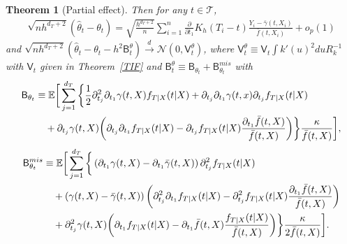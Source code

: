 \documentclass[lettersize, 12pt]{article}
\newtheorem{theorem}{Theorem}
\begin{document}
\begin{theorem}[Partial effect]
Then for any $t \in \mathcal{T}$, 
\begin{align}
\sqrt{nh^{d_T + 2}}( \hat \theta_t - \theta_{t} ) = \sqrt{\frac{h^{d_T+2}}{n}}  \sum_{i=1}^n \frac{\partial}{\partial t_1} K_h(T_i - t) \frac{Y_i - \bar\gamma(t, X_i)}{\bar f(t,X_i)}
 + o_p(1)
 \label{EIFME}
 \end{align}
and 
$\sqrt{nh^{d_T + 2}}( \hat \theta_t - \theta_{t} - h^2 \mathsf{B}_t^\theta)   \stackrel{d}{\longrightarrow}  \mathcal{N}(0, \mathsf{V}_t^\theta)$,
where 
$\mathsf{V}_t^\theta \equiv \mathsf{V}_t \int k'(u)^2du R_k^{-1}$ with $\mathsf{V}_t$ given in Theorem~\ref{TIF}
and 
$\mathsf{B}^{\theta}_t \equiv\mathsf{B}_{\theta_t}  + \mathsf{B}_{\theta_t}^{mis}$ with
\begin{align*}
\mathsf{B}_{\theta_t} &\equiv \mathbb{E}\bigg[
\sum_{j=1}^{d_T}   
 \bigg\{
 \frac{1}{2}\partial_{t_j}^2 \partial_{t_1} \gamma(t, X) f_{T|X}(t|X)+ \partial_{t_j} \partial_{t_1} \gamma(t, x) \partial_{t_j}f_{T|X}(t|X)
\notag\\
&\ \ \  +  \partial_{t_j} \gamma(t, X) 
\bigg( \partial_{t_j} \partial_{t_1} f_{T|X}(t|X) - \partial_{t_j} f_{T|X}(t|X)
 \frac{\partial_{t_1}\bar f(t,X) }{\bar f(t,X)}\bigg)
\bigg\} \frac{\kappa}{\bar f(t,X)} \bigg], 
\end{align*}
\begin{align*}
\mathsf{B}_{\theta_t}^{mis} &\equiv\mathbb{E}\bigg[\sum_{j=1}^{d_T}   
 \bigg\{ \left(\partial_{t_1} \gamma(t,X) - \partial_{t_1}\bar \gamma(t, X)\right)  \partial_{t_j}^2 f_{T|X}(t|X)
\notag \\
& \ \ \ 
+  \left(\gamma(t,X) - \bar \gamma(t, X)\right)
\left( \partial_{t_j}^2 \partial_{t_1} f_{T|X}(t|X)
- \partial_{t_j}^2 f_{T|X}(t|X) \frac{\partial_{t_1}\bar f(t,X) }{\bar f(t,X)}\right)
\notag\\
&\ \ \ 
+ \partial_{t_j}^2 \gamma(t,X)\bigg(\partial_{t_1} f_{T|X}(t|X)-  \partial_{t_1}\bar f(t,X)\frac{f_{T|X}(t|X) }{\bar f(t,X)}\bigg)
\bigg\} \frac{\kappa}{2\bar f(t,X)} \bigg].
\end{align*}


\label{TME}
\end{theorem}
\end{document}
